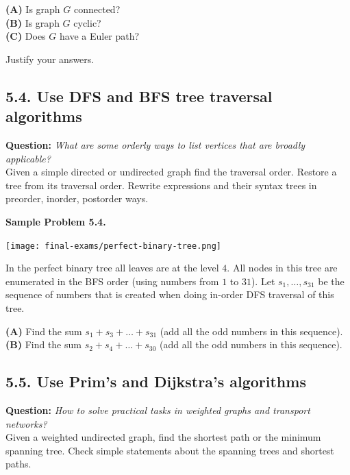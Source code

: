 \documentclass[jou]{apa6}
\begin{document}
{\bf (A)} Is graph $G$ connected?\\
{\bf (B)} Is graph $G$ cyclic?\\
{\bf (C)} Does $G$ have a Euler path?

Justify your answers.



\subsection{5.4. Use DFS and BFS tree traversal algorithms} 

{\bf Question:} {\em What are some orderly ways to list vertices that are broadly applicable?}\\
{\scriptsize 
Given a simple directed or undirected graph find the traversal order. 
Restore a tree from its traversal order. Rewrite expressions and their syntax trees in preorder, inorder, postorder ways.
}



\vspace{6pt}
{\bf Sample Problem 5.4.}\\

\begin{center}
\texttt{[image: final-exams/perfect-binary-tree.png]}
\end{center}

In the perfect binary tree all leaves are at the level $4$. 
All nodes in this tree are enumerated in the BFS order (using numbers from $1$ to $31$). 
Let $s_1,\ldots,s_{31}$ be the sequence of numbers that is created when doing in-order DFS traversal of this tree. 

{\bf (A)} Find the sum $s_1 + s_3 + \ldots + s_{31}$ (add all the odd numbers in this sequence).\\
{\bf (B)} Find the sum $s_2 + s_4 + \ldots + s_{30}$ (add all the odd numbers in this sequence).\\


\subsection{5.5. Use Prim's and Dijkstra's algorithms}

{\bf Question:} {\em How to solve practical tasks in weighted graphs and transport networks?}\\
{\scriptsize 
Given a weighted undirected graph, find the shortest path or the minimum spanning tree. 
Check simple statements about the spanning trees and shortest paths. 
}
\end{document}
